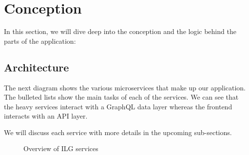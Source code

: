 \section{Conception}
In this section, we will dive deep into the conception and the logic behind the parts of the application:

\subsection{Architecture}
The next diagram shows the various microservices that make up our application.
The bulleted lists show the main tasks of each of the services.
We can see that the heavy services interact with a GraphQL data layer whereas the frontend interacts with an API layer.

We will discuss each service with more details in the upcoming sub-sections.

\begin{figure}[H]
	\centering
	\caption{Overview of ILG services}
	\label{fig:services-overview}
\end{figure}

